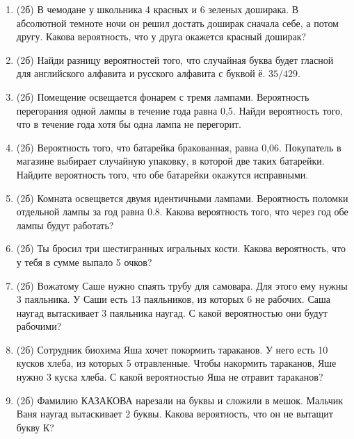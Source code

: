 \documentclass[a4paper, 12pt]{article}
\begin{document}
\newpage
\begin{enumerate}
\item (2б) В чемодане у школьника 4 красных и 6 зеленых доширака. В абсолютной темноте ночи он решил достать доширак сначала себе, а потом другу. 
Какова вероятность, что у друга окажется красный доширак? 
\item (2б) Найди разницу вероятностей того, что случайная буква будет гласной для английского алфавита и русского алфавита с буквой ё. $35/429$.
\item (2б) Помещение освещается фонарем с тремя лампами. Вероятность перегорания одной лампы в течение года равна 0,5. Найди вероятность того, 
что в течение года хотя бы одна лампа не перегорит. 
\item (2б) Вероятность того, что батарейка бракованная, равна 0,06. Покупатель в магазине выбирает случайную упаковку, в которой две таких батарейки. 
Найдите вероятность того, что обе батарейки окажутся исправными. 
\item (2б) Комната освещвется двумя идентичными лампами. Вероятность поломки отдельной лампы за год равна 0.8. Какова вероятность того, 
что через год обе лампы будут работать?
\item (2б) Ты бросил три шестигранных игральных кости. Какова вероятность, что у тебя в сумме выпало 5 очков? 
\item (2б) Вожатому Саше нужно спаять трубу для самовара. Для этого ему нужны 3 паяльника. У Саши есть 13 паяльников, из которых 6 не рабочих.  
Саша наугад вытаскивает 3 паяльника наугад. С какой вероятностью они будут рабочими? 
\item (2б) Сотрудник биохима Яша хочет покормить тараканов. У него есть 10 кусков хлеба, из которых 5 отравленные. Чтобы накормить тараканов, 
Яше нужно 3 куска хлеба. С какой вероятностью Яша не отравит тараканов?  

\item (2б) Фамилию КАЗАКОВА нарезали на буквы и сложили в мешок. Мальчик Ваня наугад вытаскивает 2 буквы. 
Какова вероятность, что он не вытащит букву К? 



\end{enumerate}
\end{document}
